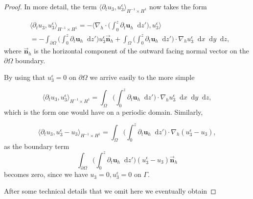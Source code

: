 \documentclass[11pt, a4paper]{article}
\newcommand*\diff{\mathop{}\!\mathrm{d}}
\begin{document}
\begin{proof}
In more detail, the term $ \langle \partial_t u_3, u_3^\epsilon \rangle _{H^{-1} \times H^1}$ now takes the form 

\begin{equation}
\begin{split}
& \langle \partial_t u_3, u_3^\epsilon \rangle _{H^{-1} \times H^1} = - \bigg \langle \nabla_h \cdot \bigg ( \int_0^z \partial_t \mathbf{u}_h \diff z' \bigg ) , u_3^\epsilon \bigg \rangle \\
& = - \int_{\partial \Omega} \bigg ( \int_0^z \partial_t \mathbf{u}_h \diff z' \bigg ) u_3^\epsilon \vec{\boldsymbol{n}}_h + \int_\Omega \bigg ( \int_0^z \partial_t \mathbf{u}_h \diff z' \bigg) \cdot \nabla_h u_3^\epsilon \diff x \diff y \diff z,
\end{split}
\end{equation}
%
where $\vec{\boldsymbol{n}}_h$ is the horizontal component of the outward facing normal vector on the $\partial \Omega$ boundary.

By using that $u_3^\epsilon = 0$ on $\partial \Omega$ we arrive easily to the more simple

$$ \langle \partial_t u_3, u_3^\epsilon \rangle _{H^{-1} \times H^1} = \int_\Omega \bigg ( \int_0^z \partial_t \mathbf{u}_h \diff z' \bigg) \cdot \nabla_h u_3^\epsilon \diff x \diff y \diff z,$$
%
which is the form one would have on a periodic domain. Similarly, 

$$ \langle \partial_t u_3, u_3^\epsilon - u_3 \rangle _{H^{-1} \times H^1} = \int_\Omega \bigg ( \int_0^z \partial_t \mathbf{u}_h \diff z' \bigg) \cdot \nabla_h (u_3^\epsilon - u_3),$$ as the boundary term $$\int_{\partial \Omega} \bigg ( \int_0^z \partial_t \mathbf{u}_h \diff z' \bigg ) (u_3^\epsilon - u_3) \vec{\boldsymbol{n}}_h$$ becomes zero, since we have $u_3 = 0, u_3^\epsilon = 0$ on $\Gamma.$ 

After some technical details that we omit here we eventually obtain


\end{proof}
\end{document}
